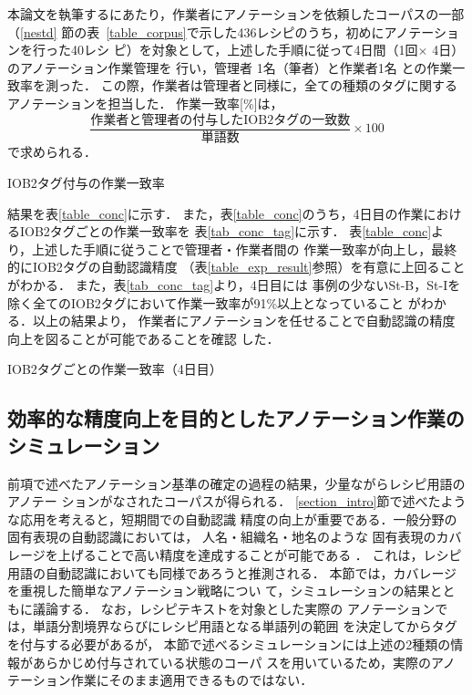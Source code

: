 \documentclass[japanese]{jnlp_1.4}
\begin{document}
本論文を執筆するにあたり，作業者にアノテーションを依頼したコーパスの一部（\ref{nestd}
節の表~\ref{table_corpus}で示した436レシピのうち，初めにアノテーションを行った40レシ
ピ）を対象として，上述した手順に従って4日間（1回$\times$ 4日）のアノテーション作業管理を
行い，管理者
1名（筆者）と作業者1名
との作業一致率を測った．
この際，作業者は管理者と同様に，全ての種類のタグに関するアノテーションを担当した．
作業一致率[\%]は，
\[
\frac{\mbox{作業者と管理者の付与したIOB2タグの一致数}}{単語数} \times 100
\]
で求められる．

\begin{table}[b]
  \caption{IOB2タグ付与の作業一致率}
  \label{table_conc}

\vspace{-0.5\Cvs}
\end{table}

結果を表\ref{table_conc}に示す．
また，表\ref{table_conc}のうち，4日目の作業におけるIOB2タグごとの作業一致率を
表\ref{tab_conc_tag}に示す．
表\ref{table_conc}より，上述した手順に従うことで管理者・作業者間の
作業一致率が向上し，最終的にIOB2タグの自動認識精度
（表\ref{table_exp_result}参照）を有意に上回ることがわかる．
また，表\ref{tab_conc_tag}より，4日目には
事例の少ないSt-B，St-Iを除く全てのIOB2タグにおいて作業一致率が91\%以上となっていること
がわかる．以上の結果より，
作業者にアノテーションを任せることで自動認識の精度向上を図ることが可能であることを確認
した．

\begin{table}[t]
\caption{IOB2タグごとの作業一致率（4日目）}
\label{tab_conc_tag}

\end{table}


\subsection{効率的な精度向上を目的としたアノテーション作業のシミュレーション}

前項で述べたアノテーション基準の確定の過程の結果，少量ながらレシピ用語のアノテー
ションがなされたコーパスが得られる．
\ref{section_intro}節で述べたような応用を考えると，短期間での自動認識
精度の向上が重要である．一般分野の固有表現の自動認識においては，
人名・組織名・地名のような
固有表現のカバレージを上げることで高い精度を達成することが可能である
\cite{Japanese.Named.Entity.Extraction.Evaluation.-.Analysis.of.Results.-}
．
これは，レシピ用語の自動認識においても同様であろうと推測される．
本節では，カバレージを重視した簡単なアノテーション戦略につい
て，シミュレーションの結果とともに議論する．
なお，レシピテキストを対象とした実際の
アノテーションでは，単語分割境界ならびにレシピ用語となる単語列の範囲
を決定してからタグを付与する必要があるが，
本節で述べるシミュレーションには上述の2種類の情報があらかじめ付与されている状態のコーパ
スを用いているため，実際のアノテーション作業にそのまま適用できるものではない．
\end{document}
